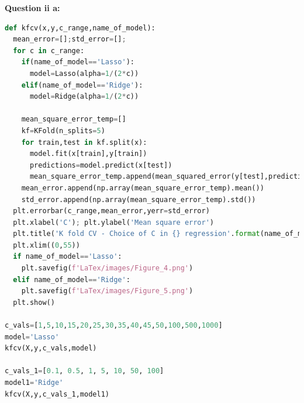\documentclass[10pt]{article}
\begin{document}
\textbf{Question ii a:}
\begin{lstlisting}[language=Python]
  def kfcv(x,y,c_range,name_of_model):
  mean_error=[];std_error=[];
  for c in c_range:
    if(name_of_model=='Lasso'):
      model=Lasso(alpha=1/(2*c))
    elif(name_of_model=='Ridge'):
      model=Ridge(alpha=1/(2*c))
    
    mean_square_error_temp=[]
    kf=KFold(n_splits=5)
    for train,test in kf.split(x):
      model.fit(x[train],y[train])
      predictions=model.predict(x[test])
      mean_square_error_temp.append(mean_squared_error(y[test],predictions))
    mean_error.append(np.array(mean_square_error_temp).mean())
    std_error.append(np.array(mean_square_error_temp).std())
  plt.errorbar(c_range,mean_error,yerr=std_error)
  plt.xlabel('C'); plt.ylabel('Mean square error')
  plt.title('K fold CV - Choice of C in {} regression'.format(name_of_model))
  plt.xlim((0,55))
  if name_of_model=='Lasso':
    plt.savefig(f'LaTex/images/Figure_4.png')
  elif name_of_model=='Ridge':
    plt.savefig(f'LaTex/images/Figure_5.png')
  plt.show()

c_vals=[1,5,10,15,20,25,30,35,40,45,50,100,500,1000]
model='Lasso'
kfcv(X,y,c_vals,model)

c_vals_1=[0.1, 0.5, 1, 5, 10, 50, 100]
model1='Ridge'
kfcv(X,y,c_vals_1,model1)
\end{lstlisting}
\end{document}
